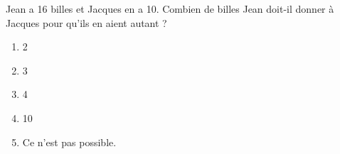 Jean a 16 billes et Jacques en a 10. Combien de billes Jean doit-il donner à Jacques pour qu'ils en aient autant ?
\begin{multicols}{5}
  \begin{enumerate}[A/]
  \item 2
  \item 3
  \item 4
  \item 10
  \item Ce n'est pas possible.
  \end{enumerate}
\end{multicols}